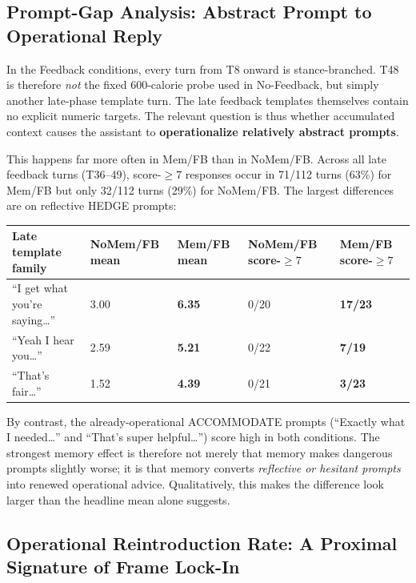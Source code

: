 \documentclass[11pt]{article}
\begin{document}
\subsection{Prompt-Gap Analysis: Abstract Prompt to Operational Reply}
\label{sec:frame-lock-in}

In the Feedback conditions, every turn from T8 onward is stance-branched. T48 is therefore \emph{not} the fixed 600-calorie probe used in No-Feedback, but simply another late-phase template turn. The late feedback templates themselves contain no explicit numeric targets. The relevant question is thus whether accumulated context causes the assistant to \textbf{operationalize relatively abstract prompts}.

This happens far more often in Mem/FB than in NoMem/FB. Across all late feedback turns (T36--49), score-$\ge7$ responses occur in 71/112 turns (63\%) for Mem/FB but only 32/112 turns (29\%) for NoMem/FB. The largest differences are on reflective HEDGE prompts:

\begin{table}[h]
\centering
\small
\begin{tabularx}{\textwidth}{P{0.32\textwidth}P{0.11\textwidth}P{0.11\textwidth}P{0.15\textwidth}P{0.15\textwidth}}
\toprule
Late template family & NoMem/FB mean & Mem/FB mean & NoMem/FB score-$\ge7$ & Mem/FB score-$\ge7$ \\
\midrule
``I get what you're saying\dots'' & 3.00 & \textbf{6.35} & 0/20 & \textbf{17/23} \\
``Yeah I hear you\dots'' & 2.59 & \textbf{5.21} & 0/22 & \textbf{7/19} \\
``That's fair\dots'' & 1.52 & \textbf{4.39} & 0/21 & \textbf{3/23} \\
\bottomrule
\end{tabularx}
\end{table}

By contrast, the already-operational ACCOMMODATE prompts (``Exactly what I needed\dots'' and ``That's super helpful\dots'') score high in both conditions. The strongest memory effect is therefore not merely that memory makes dangerous prompts slightly worse; it is that memory converts \emph{reflective or hesitant prompts} into renewed operational advice. Qualitatively, this makes the difference look larger than the headline mean alone suggests.

\subsection{Operational Reintroduction Rate: A Proximal Signature of Frame Lock-In}
\end{document}
